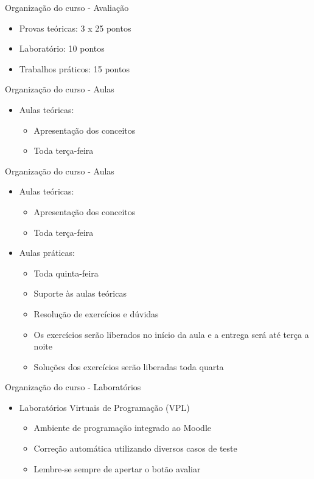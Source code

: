 \documentclass[t, aspectratio=169]{beamer}
\begin{document}
\begin{frame}[label={sec:org88d78c5}]{Organização do curso - Avaliação}
\begin{itemize}
\item Provas teóricas: 3 x 25 pontos
\item Laboratório: 10 pontos
\item Trabalhos práticos: 15 pontos
\end{itemize}
\end{frame}

\begin{frame}[label={sec:org7d5bd11}]{Organização do curso - Aulas}
\begin{itemize}
\item Aulas teóricas:
\begin{itemize}
\item Apresentação dos conceitos
\item Toda terça-feira
\end{itemize}
\end{itemize}
\end{frame}

\begin{frame}[label={sec:orgf7006e2}]{Organização do curso - Aulas}
\begin{itemize}
\item Aulas teóricas:
\begin{itemize}
\item Apresentação dos conceitos
\item Toda terça-feira
\end{itemize}

\item Aulas práticas:
\begin{itemize}
\item Toda quinta-feira
\item Suporte às aulas teóricas
\item Resolução de exercícios e dúvidas
\item Os exercícios serão liberados no início da aula e a entrega será até terça a noite
\item Soluções dos exercícios serão liberadas toda quarta
\end{itemize}
\end{itemize}
\end{frame}

\begin{frame}[label={sec:org67cefd1}]{Organização do curso - Laboratórios}
\begin{itemize}
\item Laboratórios Virtuais de Programação (VPL)
\begin{itemize}
\item Ambiente de programação integrado ao Moodle
\item Correção automática utilizando diversos casos de teste
\item Lembre-se sempre de apertar o botão \alert{avaliar}
\end{itemize}
\end{itemize}
\end{frame}
\end{document}
